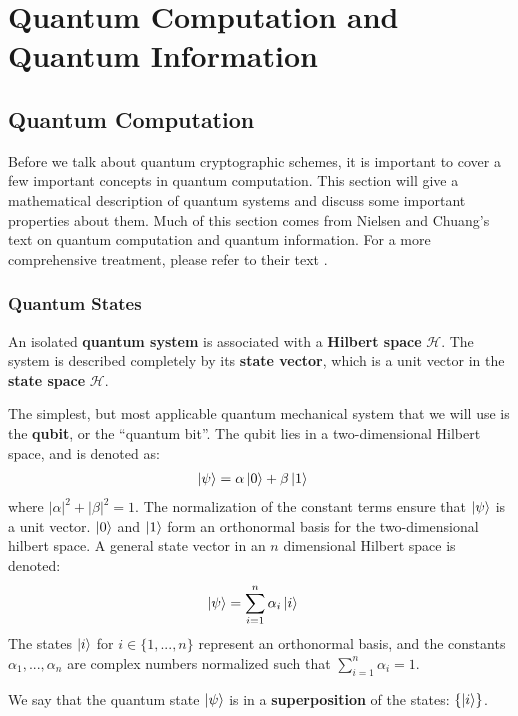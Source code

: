 \chapter{Quantum Computation and Quantum Information}
\label{ch:qc-prelim}

\section{Quantum Computation}
\label{sec:qc}

Before we talk about quantum cryptographic schemes, it is important to cover a few important concepts in quantum computation. This section will give a mathematical description of quantum systems and discuss some important properties about them. Much of this section comes from Nielsen and Chuang's text on quantum computation and quantum information. For a more comprehensive treatment, please refer to their text \cite{nielsen_quantum_2010}.

\subsection{Quantum States}

An isolated \textbf{quantum system} is associated with a \textbf{Hilbert space} $\mathcal{H}$. The system is described completely by its \textbf{state vector}, which is a unit vector in the \textbf{state space} $\mathcal{H}$.

The simplest, but most applicable quantum mechanical system that we will use is the \textbf{qubit}, or the ``quantum bit''. The qubit lies in a two-dimensional Hilbert space, and is denoted as:
\begin{align}
    \ket{\psi} &= \alpha \ket{0} + \beta \ket{1}
\end{align}
where $|\alpha|^2 + |\beta|^2 = 1$. The normalization of the constant terms ensure that $\ket{\psi}$ is a unit vector. $\ket{0}$ and $\ket{1}$ form an orthonormal basis for the two-dimensional hilbert space. A general state vector in an $n$ dimensional Hilbert space is denoted:
\begin{align}
    \ket{\psi} &= \sum_{i=1}^n \alpha_i\ket{i}
\end{align}
The states $\ket{i}$ for $i \in \{1,...,n\}$ represent an orthonormal basis, and the constants $\alpha_1,...,\alpha_n$ are complex numbers normalized such that $\sum_{i=1}^n \alpha_i = 1$.

We say that the quantum state $\ket{\psi}$ is in a \textbf{superposition} of the states: $\{\ket{i}\}$.


